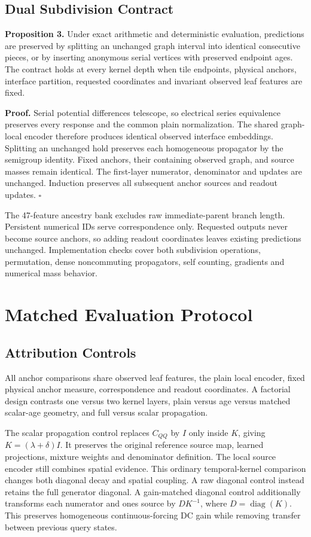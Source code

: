 \documentclass[letterpaper]{article}
\begin{document}
\subsection{Dual Subdivision Contract}
\textbf{Proposition 3.}
Under exact arithmetic and deterministic evaluation, predictions are preserved by splitting an unchanged graph interval into identical consecutive pieces, or by inserting anonymous serial vertices with preserved endpoint ages. The contract holds at every kernel depth when tile endpoints, physical anchors, interface partition, requested coordinates and invariant observed leaf features are fixed.

\textbf{Proof.}
Serial potential differences telescope, so electrical series equivalence preserves every response and the common plain normalization. The shared graph-local encoder therefore produces identical observed interface embeddings. Splitting an unchanged hold preserves each homogeneous propagator by the semigroup identity. Fixed anchors, their containing observed graph, and source masses remain identical. The first-layer numerator, denominator and updates are unchanged. Induction preserves all subsequent anchor sources and readout updates. $\square$

The 47-feature ancestry bank excludes raw immediate-parent branch length. Persistent numerical IDs serve correspondence only. Requested outputs never become source anchors, so adding readout coordinates leaves existing predictions unchanged. Implementation checks cover both subdivision operations, permutation, dense noncommuting propagators, self counting, gradients and numerical mass behavior.


\section{Matched Evaluation Protocol}
\subsection{Attribution Controls}
All anchor comparisons share observed leaf features, the plain local encoder, fixed physical anchor measure, correspondence and readout coordinates. A factorial design contrasts one versus two kernel layers, plain versus age versus matched scalar-age geometry, and full versus scalar propagation.

The scalar propagation control replaces $C_{QQ}$ by $I$ only inside $K$, giving $K=(\lambda+\delta)I$. It preserves the original reference source map, learned projections, mixture weights and denominator definition. The local source encoder still combines spatial evidence. This ordinary temporal-kernel comparison changes both diagonal decay and spatial coupling. A raw diagonal control instead retains the full generator diagonal. A gain-matched diagonal control additionally transforms each numerator and ones source by $D K^{-1}$, where $D=\operatorname{diag}(K)$. This preserves homogeneous continuous-forcing DC gain while removing transfer between previous query states.
\end{document}
